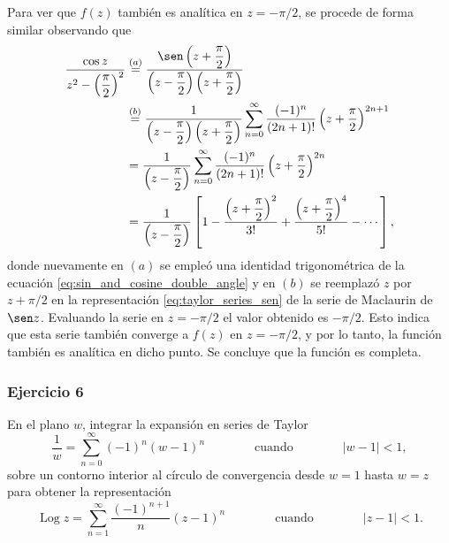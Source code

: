 \documentclass[a4paper]{report}
\DeclareMathOperator{\Log}{Log}
\begin{document}
Para ver que \(f(z)\) también es analítica en \(z=-\pi/2\), se procede de forma similar observando que 
\begin{align*}
 \dfrac{\cos z}{z^2-\left(\dfrac{\pi}{2}\right)^2}&\overset{(a)}{=}\dfrac{\sen\left(z+\dfrac{\pi}{2}\right)}{\left(z-\dfrac{\pi}{2}\right)\left(z+\dfrac{\pi}{2}\right)}\\
 &\overset{(b)}{=}\dfrac{1}{\left(z-\dfrac{\pi}{2}\right)\left(z+\dfrac{\pi}{2}\right)}\sum_{n=0}^\infty\frac{(-1)^n}{(2n+1)!}\left(z+\dfrac{\pi}{2}\right)^{2n+1}\\
 &=\dfrac{1}{\left(z-\dfrac{\pi}{2}\right)}\sum_{n=0}^\infty\frac{(-1)^n}{(2n+1)!}\left(z+\dfrac{\pi}{2}\right)^{2n}\\
 &=\dfrac{1}{\left(z-\dfrac{\pi}{2}\right)}\left[1-\dfrac{\left(z+\dfrac{\pi}{2}\right)^2}{3!}+\dfrac{\left(z+\dfrac{\pi}{2}\right)^4}{5!}-\cdots\right],
\end{align*}
donde nuevamente en \((a)\) se empleó una identidad trigonométrica de la ecuación \ref{eq:sin_and_cosine_double_angle} y en \((b)\) se reemplazó \(z\) por \(z+\pi/2\) en la representación \ref{eq:taylor_series_sen} de la serie de Maclaurin de \(\sen z\). Evaluando la serie en \(z=-\pi/2\) el valor obtenido es \(-\pi/2\). Esto indica que esta serie también converge a \(f(z)\) en \(z=-\pi/2\), y por lo tanto, la función también es analítica en dicho punto. Se concluye que la función es completa.

\subsubsection*{Ejercicio 6}

En el plano \(w\), integrar la expansión en series de Taylor
\[
 \frac{1}{w}=\sum_{n=0}^\infty(-1)^n(w-1)^n
 \qquad\qquad\textrm{cuando}\qquad\qquad
 |w-1|<1,
\]
sobre un contorno interior al círculo de convergencia desde \(w=1\) hasta \(w=z\) para obtener la representación
\[
 \Log z=\sum_{n=1}^\infty\frac{(-1)^{n+1}}{n}(z-1)^n
 \qquad\qquad\textrm{cuando}\qquad\qquad
 |z-1|<1.
\]
\end{document}

